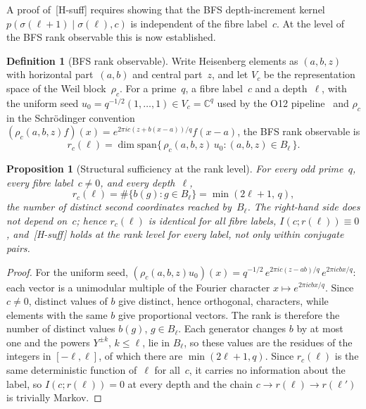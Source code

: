 \documentclass[11pt,a4paper]{article}
\theoremstyle{plain}
\newtheorem{proposition}[theorem]{Proposition}
\theoremstyle{definition}
\newtheorem{definition}[theorem]{Definition}
\theoremstyle{remark}
\begin{document}
  A proof of~\textup{[H-suff]} requires showing that the BFS depth-increment kernel
  $p(\sigma(\ell+1) \mid \sigma(\ell), c)$ is independent of the fibre label~$c$.
  At the level of the BFS rank observable this is now established.

  \begin{definition}[BFS rank observable]
    \label{def:rank}
    Write Heisenberg elements as $(a,b,z)$ with horizontal part~$(a,b)$ and central part~$z$,
    and let $V_c$ be the representation space of the Weil block~$\rho_c$.
    For a prime~$q$, a fibre label~$c$ and a depth~$\ell$, with the uniform seed
    $u_0 = q^{-1/2}(1,\dots,1) \in V_c = \mathbb{C}^q$ used by the O12
    pipeline~\cite{Beau2026a16} and $\rho_c$ in the Schr\"odinger convention
    $(\rho_c(a,b,z)f)(x) = e^{2\pi i c(z + b(x-a))/q} f(x-a)$,
    the BFS rank observable is
    \begin{equation}
      \label{eq:rank-def}
      r_c(\ell) = \dim \mathrm{span}
      \bigl\{\, \rho_c(a,b,z)\, u_0 : (a,b,z) \in B_\ell \,\bigr\}.
    \end{equation}
  \end{definition}

  \begin{proposition}[Structural sufficiency at the rank level]
    \label{prop:rank-suff}
    For every odd prime~$q$, every fibre label~$c \neq 0$, and every depth~$\ell$,
    \begin{equation}
      \label{eq:rank-l1}
      r_c(\ell)
      = \#\bigl\{ b(g) : g \in B_\ell \bigr\}
      = \min(2\ell + 1,\, q),
    \end{equation}
    the number of distinct second coordinates reached by~$B_\ell$.
    The right-hand side does not depend on~$c$;
    hence $r_c(\ell)$ is identical for all fibre labels, $I(c; r(\ell)) \equiv 0$,
    and~\textup{[H-suff]} holds at the rank level for every label,
    not only within conjugate pairs.
  \end{proposition}

  \begin{proof}
    For the uniform seed,
    $(\rho_c(a,b,z)u_0)(x) = q^{-1/2}\, e^{2\pi i c(z - ab)/q}\, e^{2\pi i c b x/q}$:
    each vector is a unimodular multiple of the Fourier character $x \mapsto e^{2\pi i cbx/q}$.
    Since $c \neq 0$, distinct values of $b$ give distinct, hence orthogonal, characters,
    while elements with the same $b$ give proportional vectors.
    The rank is therefore the number of distinct values $b(g)$, $g \in B_\ell$.
    Each generator changes $b$ by at most one and the powers $Y^{\pm k}$, $k \leq \ell$, lie in
    $B_\ell$, so these values are the residues of the integers in $[-\ell, \ell]$, of which there
    are $\min(2\ell+1, q)$.
    Since $r_c(\ell)$ is the same deterministic function of~$\ell$ for all~$c$,
    it carries no information about the label, so $I(c; r(\ell)) = 0$ at every depth
    and the chain $c \to r(\ell) \to r(\ell')$ is trivially Markov.
  \end{proof}
\end{document}
